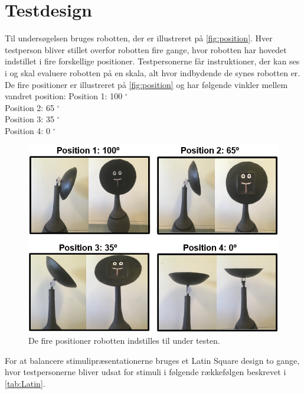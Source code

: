 \section*{Testdesign}
%
Til undersøgelsen bruges robotten, der er illustreret på \autoref{fig:position}. Hver testperson bliver stillet overfor robotten fire gange, hvor robotten har hovedet indstillet i fire forskellige positioner. Testpersonerne får instruktioner, der kan ses i  og skal evaluere robotten på en skala, alt hvor indbydende de synes robotten er. De fire positioner er illustreret på \autoref{fig:position} og har følgende vinkler mellem vandret position:\blankline
%
Position 1: 100 $^{\circ}$\\
Position 2: 65 $^{\circ}$\\
Position 3: 35 $^{\circ}$\\
Position 4: 0 $^{\circ}$\blankline
%
\begin{figure}[H]
\centering
\includegraphics[width = \textwidth]{Figure/positionerBilleder.PNG} 
\caption{De fire positioner robotten indstilles til under testen.}
\label{fig:position}
\end{figure}
%
\noindent For at balancere stimulipræsentationerne bruges et Latin Square design to gange, hvor testpersonerne bliver udsat for stimuli i følgende rækkefølgen beskrevet i \autoref{tab:Latin}.\blankline
%
